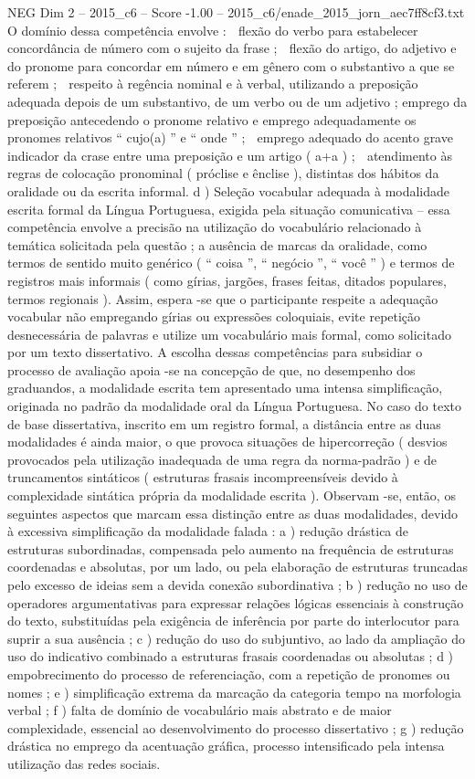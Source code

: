 \begin{textsample}{NEG Dim 2 – 2015\_c6 – Score -1.00 – 2015\_c6/enade\_2015\_jorn\_aec7ff8cf3.txt}
O domínio dessa competência envolve :  flexão do verbo para estabelecer concordância de número com o sujeito da frase ;  flexão do artigo, do adjetivo e do pronome para concordar em número e em gênero com o substantivo a que se referem ;  respeito à regência nominal e à verbal, utilizando a preposição adequada depois de um substantivo, de um verbo ou de um adjetivo ; emprego da preposição antecedendo o pronome relativo e emprego adequadamente os pronomes relativos “ cujo(a) ” e “ onde ” ;  emprego adequado do acento grave indicador da crase entre uma preposição e um artigo ( a+a ) ;  atendimento às regras de colocação pronominal ( próclise e ênclise ), distintas dos hábitos da oralidade ou da escrita informal. d ) Seleção vocabular adequada à modalidade escrita formal da Língua Portuguesa, exigida pela situação comunicativa – essa competência envolve a precisão na utilização do vocabulário relacionado à temática solicitada pela questão ; a ausência de marcas da oralidade, como termos de sentido muito genérico ( “ coisa ”, “ negócio ”, “ você ” ) e termos de registros mais informais ( como gírias, jargões, frases feitas, ditados populares, termos regionais ).
Assim, espera -se que o participante respeite a adequação vocabular não empregando gírias ou expressões coloquiais, evite repetição desnecessária de palavras e utilize um vocabulário mais formal, como solicitado por um texto dissertativo.
A escolha dessas competências para subsidiar o processo de avaliação apoia -se na concepção de que, no desempenho dos graduandos, a modalidade escrita tem apresentado uma intensa simplificação, originada no padrão da modalidade oral da Língua Portuguesa.
No caso do texto de base dissertativa, inscrito em um registro formal, a distância entre as duas modalidades é ainda maior, o que provoca situações de hipercorreção ( desvios provocados pela utilização inadequada de uma regra da norma-padrão ) e de truncamentos sintáticos ( estruturas frasais incompreensíveis devido à complexidade sintática própria da modalidade escrita ).
Observam -se, então, os seguintes aspectos que marcam essa distinção entre as duas modalidades, devido à excessiva simplificação da modalidade falada : a ) redução drástica de estruturas subordinadas, compensada pelo aumento na frequência de estruturas coordenadas e absolutas, por um lado, ou pela elaboração de estruturas truncadas pelo excesso de ideias sem a devida conexão subordinativa ; b ) redução no uso de operadores argumentativas para expressar relações lógicas essenciais à construção do texto, substituídas pela exigência de inferência por parte do interlocutor para suprir a sua ausência ; c ) redução do uso do subjuntivo, ao lado da ampliação do uso do indicativo combinado a estruturas frasais coordenadas ou absolutas ; d ) empobrecimento do processo de referenciação, com a repetição de pronomes ou nomes ; e ) simplificação extrema da marcação da categoria tempo na morfologia verbal ; f ) falta de domínio de vocabulário mais abstrato e de maior complexidade, essencial ao desenvolvimento do processo dissertativo ; g ) redução drástica no emprego da acentuação gráfica, processo intensificado pela intensa utilização das redes sociais.

\end{textsample}
